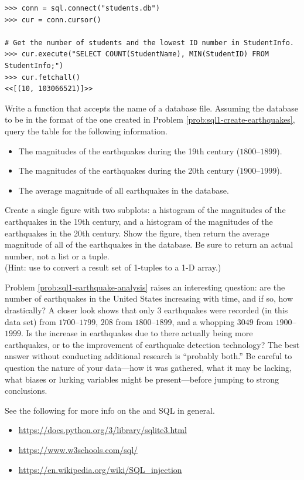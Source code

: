 \begin{lstlisting}
>>> conn = sql.connect("students.db")
>>> cur = conn.cursor()

# Get the number of students and the lowest ID number in StudentInfo.
>>> cur.execute("SELECT COUNT(StudentName), MIN(StudentID) FROM StudentInfo;")
>>> cur.fetchall()
<<[(10, 103066521)]>>
\end{lstlisting}

\begin{problem}
Write a function that accepts the name of a database file.
Assuming the database to be in the format of the one created in Problem \ref{prob:sql1-create-earthquakes}, query the  table for the following information.
\begin{itemize}
    \item The magnitudes of the earthquakes during the 19th century ($1800$--$1899$).
    \item The magnitudes of the earthquakes during the 20th century ($1900$--$1999$).
    \item The average magnitude of all earthquakes in the database.
\end{itemize}
Create a single figure with two subplots: a histogram of the magnitudes of the earthquakes in the 19th century, and a histogram of the magnitudes of the earthquakes in the 20th century.
Show the figure, then return the average magnitude of all of the earthquakes in the database.
Be sure to return an actual number, not a list or a tuple.
\\(Hint: use  to convert a result set of 1-tuples to a 1-D array.)
\label{prob:sql1-earthquake-analysis}
\end{problem}

\begin{info} %
Problem \ref{prob:sql1-earthquake-analysis} raises an interesting question: are the number of earthquakes in the United States increasing with time, and if so, how drastically?
A closer look shows that only $3$ earthquakes were recorded (in this data set) from $1700$--$1799$, $208$ from $1800$--$1899$, and a whopping $3049$ from $1900$--$1999$.
Is the increase in earthquakes due to there actually being more earthquakes, or to the improvement of earthquake detection technology?
The best answer without conducting additional research is ``probably both.''
Be careful to question the nature of your data---how it was gathered, what it may be lacking, what biases or lurking variables might be present---before jumping to strong conclusions.
\end{info}
%
See the following for more info on the  and SQL in general.
\begin{itemize}
    \item \url{https://docs.python.org/3/library/sqlite3.html}
    \item \url{https://www.w3schools.com/sql/}
    \item \url{https://en.wikipedia.org/wiki/SQL_injection}
\end{itemize}

